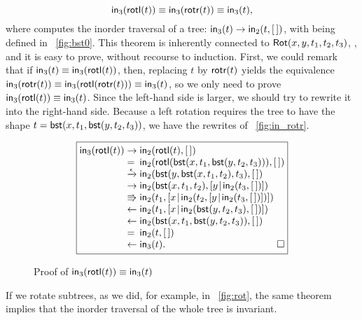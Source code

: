 \begin{equation*}
  \abovedisplayskip=5pt
  \belowdisplayskip=5pt
  \fun{in}_3(\fun{rotl}(t)) \equiv \fun{in}_3(\fun{rotr}(t)) \equiv
  \fun{in}_3(t),
\end{equation*}
where  computes the
inorder traversal of a tree: \(\textsf{in}_3(t) \rightarrow
\textsf{in}_2(t,[\,])\), with 
being defined in \fig~\vref{fig:bst0}. This theorem is inherently
connected to
\(\textsf{Rot}({x,y,t_1,t_2,t_3})\),
, and it is easy to prove, without recourse to
induction. First, we could remark that if \(\textsf{in}_3(t) \equiv
\textsf{in}_3(\textsf{rotl}(t))\), then, replacing \(t\) by
\(\textsf{rotr}(t)\) yields the equivalence \(\textsf{in}_3(\textsf{rotr}(t))
\equiv \textsf{in}_3(\textsf{rotl}(\textsf{rotr}(t))) \equiv \textsf{in}_3(t)\),
so we only need to prove \(\textsf{in}_3(\textsf{rotl}(t)) \equiv
\textsf{in}_3(t)\).  Since the left\hyp{}hand side is larger, we should
try to rewrite it into the right\hyp{}hand side. Because a left
rotation requires the tree to have the shape
\(t=\textsf{bst}(x,t_1,\textsf{bst}(y,t_2,t_3))\), we have the rewrites of
\fig~\vref{fig:in_rotr}.
\begin{figure}
  \begin{equation*}
    \boxed{
      \begin{array}{@{}r@{\;}l@{\;}l@{}}
  \fun{in}_3(\fun{rotl}(t))
  & \rightarrow & \fun{in}_2(\fun{rotl}(t),\el)\\
  & = & \fun{in}_2(\fun{rotl}(\fun{bst}(x,t_1,\fun{bst}(y,t_2,t_3))),\el)\\
  & \xrightarrow{\smash{\epsilon}} &
  \fun{in}_2(\fun{bst}(y,\fun{bst}(x,t_1,t_2),t_3),\el)\\
  & \rightarrow &
  \fun{in}_2(\fun{bst}(x,t_1,t_2),\cons{y}{\fun{in}_2(t_3,\el)})\\
  & \Rrightarrow &
 \fun{in}_2(t_1,\cons{x}{\fun{in}_2(t_2,\cons{y}{\fun{in}_2(t_3,\el)})})\\
  & \leftarrow &
  \fun{in}_2(t_1,\cons{x}{\fun{in}_2(\fun{bst}(y,t_2,t_3),\el)})\\
  & \leftarrow &
  \fun{in}_2(\fun{bst}(x,t_1,\fun{bst}(y,t_2,t_3)),\el)\\
  & = &
  \fun{in}_2(t,\el)\\
  & \leftarrow &
  \fun{in}_3(t).\hfill\Box
\end{array}
}
\end{equation*}
\caption{Proof of \(\textsf{in}_3(\textsf{rotl}(t)) \equiv
  \textsf{in}_3(t)\)\label{fig:in_rotr}}
\end{figure}
If we rotate subtrees, as we did, for example, in \fig~\vref{fig:rot},
the same theorem implies that the inorder traversal of the whole tree
is invariant.


